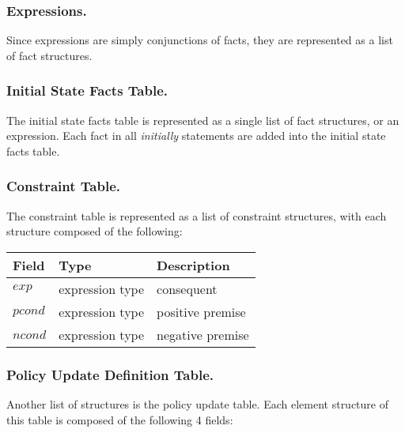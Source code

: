 \documentclass[global,twocolumn,final]{svjour}
\newenvironment{vquote}
  {\begin{list}{}{\leftmargin 1em}\item[]}
  {\end{list}}
\begin{document}
      \subsubsection{Expressions.}

        Since expressions are simply conjunctions of facts, they are
        represented as a list of fact structures.

      \subsubsection{Initial State Facts Table.}

        The initial state facts table is represented as a single list of
        fact structures, or an expression. Each fact in all {\em initially}
        statements are added into the initial state facts table.

      \subsubsection{Constraint Table.}

        The constraint table is represented as a list of constraint
        structures, with each structure composed of the following:

        \begin{vquote}
          \begin{tabular}[t]{|l|l|l|}
            \hline
            \textbf{Field} & \textbf{Type} & \textbf{Description} \\
            \hline
            $exp$ & expression type & consequent \\
            \hline
            $pcond$ & expression type & positive premise \\
            \hline
            $ncond$ & expression type & negative premise \\
            \hline
          \end{tabular}
        \end{vquote}

      \subsubsection{Policy Update Definition Table.}

        Another list of structures is the policy update table. Each element
        structure of this table is composed of the following 4 fields:
\end{document}

